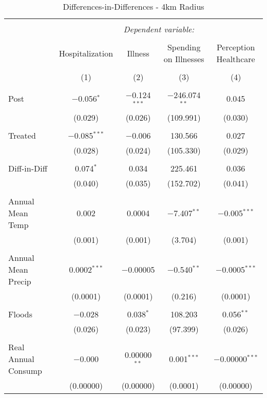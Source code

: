 
\begin{table}[!htbp] \centering 
  \caption{Differences-in-Differences - 4km Radius} 
  \label{} 
\begin{tabular}{@{\extracolsep{5pt}}lcccc} 
\\[-1.8ex]\hline 
\hline \\[-1.8ex] 
 & \multicolumn{4}{c}{\textit{Dependent variable:}} \\ 
\cline{2-5} 
\\[-1.8ex] & Hospitalization & Illness & Spending on Illnesses & Perception Healthcare \\ 
\\[-1.8ex] & (1) & (2) & (3) & (4)\\ 
\hline \\[-1.8ex] 
 Post & $-$0.056$^{*}$ & $-$0.124$^{***}$ & $-$246.074$^{**}$ & 0.045 \\ 
  & (0.029) & (0.026) & (109.991) & (0.030) \\ 
  & & & & \\ 
 Treated & $-$0.085$^{***}$ & $-$0.006 & 130.566 & 0.027 \\ 
  & (0.028) & (0.024) & (105.330) & (0.029) \\ 
  & & & & \\ 
 Diff-in-Diff & 0.074$^{*}$ & 0.034 & 225.461 & 0.036 \\ 
  & (0.040) & (0.035) & (152.702) & (0.041) \\ 
  & & & & \\ 
 Annual Mean Temp & 0.002 & 0.0004 & $-$7.407$^{**}$ & $-$0.005$^{***}$ \\ 
  & (0.001) & (0.001) & (3.704) & (0.001) \\ 
  & & & & \\ 
 Annual Mean Precip & 0.0002$^{***}$ & $-$0.00005 & $-$0.540$^{**}$ & $-$0.0005$^{***}$ \\ 
  & (0.0001) & (0.0001) & (0.216) & (0.0001) \\ 
  & & & & \\ 
 Floods & $-$0.028 & 0.038$^{*}$ & 108.203 & 0.056$^{**}$ \\ 
  & (0.026) & (0.023) & (97.399) & (0.026) \\ 
  & & & & \\ 
 Real Annual Consump & $-$0.000 & 0.00000$^{**}$ & 0.001$^{***}$ & $-$0.00000$^{***}$ \\ 
  & (0.00000) & (0.00000) & (0.0001) & (0.00000) \\ 

\end{tabular}
\end{table}
